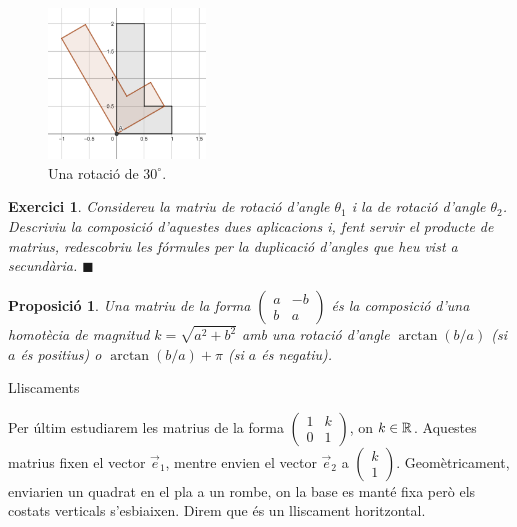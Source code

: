 \documentclass[
  11pt,
]{book}
\makeatletter
\numberwithin{dummy}{section}
\theoremstyle{maincolornumbox}
\newtheorem{exerciseT}{Exercici}[chapter]
\theoremstyle{blacknumex}
\theoremstyle{blacknumbox}
\theoremstyle{maincolornum}
\newtheorem{propositionT}{Proposició}[chapter]
\newenvironment{proposition}{\begin{pBox}\begin{propositionT}}{\end{propositionT}\end{pBox}}
\newenvironment{exercise}{\begin{eBox}\begin{exerciseT}}{\hfill{\color{maincolor}\tiny\ensuremath{\blacksquare}}\end{exerciseT}\end{eBox}}
\renewcommand{\subsection}{\@startsection {subsection}{2}{\z@}
{-3ex \@plus -0.1ex \@minus -.4ex}
{0.5ex \@plus.2ex }
{\normalfont\sffamily\bfseries}}
\makeatother
\begin{document}
\begin{figure}
\hypertarget{fig:rotacio}{%
\centering
\includegraphics[width=\textwidth,height=4cm]{rotacio.png}
\caption{Una rotació de \(30^\circ\).}\label{fig:rotacio}
}
\end{figure}

\begin{exercise}
Considereu la matriu de rotació d'angle \(\theta_1\) i la de rotació
d'angle \(\theta_2\). Descriviu la composició d'aquestes dues aplicacions
i, fent servir el producte de matrius, redescobriu les fórmules per la
duplicació d'angles que heu vist a secundària.
\end{exercise}

\begin{proposition}
Una matriu de la forma \(\begin{pmatrix}a&-b\\b&a\end{pmatrix}\) és
la composició d'una homotècia de magnitud \(k=\sqrt{a^2+b^2}\) amb una
rotació d'angle \(\arctan(b/a)\) (si \(a\) és positius) o
\(\arctan(b/a) + \pi\) (si \(a\) és negatiu).
\end{proposition}

\hypertarget{lliscaments}{%
\subsection{Lliscaments}\label{lliscaments}}

Per últim estudiarem les matrius de la forma
\(\begin{pmatrix} 1&k\\0&1\end{pmatrix}\), on \(k\in \mathbb{R}\). Aquestes matrius
fixen el vector \(\vec e_1\), mentre envien el vector \(\vec e_2\) a
\(\begin{pmatrix}k\\1\end{pmatrix}\). Geomètricament, enviarien un quadrat
en el pla a un rombe, on la base es manté fixa però els costats
verticals s'esbiaixen. Direm que és un lliscament horitzontal.
\end{document}
